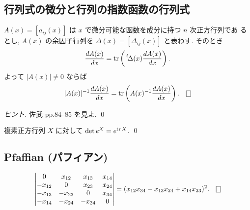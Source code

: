 \documentclass[12pt,twoside]{jarticle}
\begin{document}
\subsection{行列式の微分と行列の指数函数の行列式}

\begin{question}[行列式の微分]
  $A(x)=[a_{ij}(x)]$ は $x$ で微分可能な函数を成分に持つ $n$ 次正方行列であ
  るとし, $A(x)$ の余因子行列を $\Delta(x)=[\Delta_{ij}(x)]$ と表わす.
  そのとき
  \begin{equation*}
    \odfrac{A(x)}{x} = \trace\left(\tp{\!\Delta(x)}\odfrac{A(x)}{x}\right).
  \end{equation*}
  よって $|A(x)|\ne 0$ ならば
  \begin{equation*}
    |A(x)|^{-1}\odfrac{A(x)}{x} 
    = \trace\left(A(x)^{-1}\odfrac{A(x)}{x}\right).
    \qed
  \end{equation*}
\end{question}

\begin{proof}[ヒント]
  佐武 \cite{satake} pp.84--85 を見よ. \qed
\end{proof}

\begin{question}[行列の指数函数の行列式]
  複素正方行列 $X$ に対して \(\det e^X = e^{\mathop{\mathrm{tr}}\nolimits X} \). \qed
\end{question}


\subsection{Pfaffian (パフィアン)}
\label{sec:Pfaffian}

\begin{question}
  \quad
  \begin{equation*}
    \begin{vmatrix}
         0    &  x_{12} &  x_{13} & x_{14} \\
      -x_{12} &    0    &  x_{23} & x_{24} \\
      -x_{13} & -x_{23} &    0    & x_{34} \\
      -x_{14} & -x_{24} & -x_{34} &   0 \\
    \end{vmatrix}
    =(x_{12}x_{34}-x_{13}x_{24}+x_{14}x_{23})^2.
    \qed
  \end{equation*}
\end{question}
\end{document}

